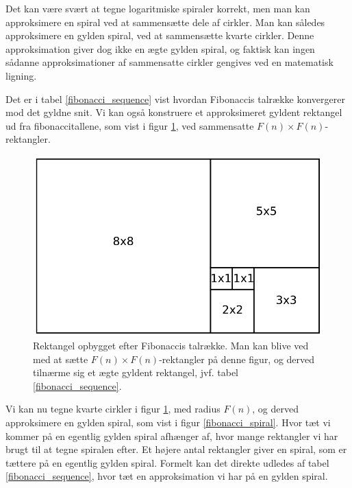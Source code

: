 {Det kan være svært at tegne logaritmiske spiraler korrekt, men man kan
approksimere en spiral ved at sammensætte dele af cirkler. Man kan
således approksimere en gylden spiral, ved at sammensætte kvarte
cirkler.  Denne approksimation giver dog ikke en ægte gylden spiral, og
faktisk kan ingen sådanne approksimationer af sammensatte cirkler
gengives ved en matematisk ligning\cite{Sharp2002}. 

Det er i tabel \ref{fibonacci_sequence} vist hvordan Fibonaccis talrække
konvergerer mod det gyldne snit. Vi kan også konstruere et approksimeret
gyldent rektangel ud fra fibonaccitallene, som vist i figur
\ref{fibonacci_rektangel}, ved sammensatte $F(n)\times F(n)$-rektangler.

\begin{figure}[t]
    \centering
	\includegraphics[scale=0.35,angle=0]{afsnit/baggrund/billeder/fib_rect}
    \caption[Rektangel opbygget efter Fibonaccis talrække]{Rektangel
    opbygget efter Fibonaccis talrække. Man kan blive ved med at sætte
    $F(n)\times F(n)$-rektangler på denne figur, og derved tilnærme sig et
    ægte gyldent rektangel, jvf. tabel \ref{fibonacci_sequence}.}
	\label{fibonacci_rektangel}
\end{figure}

Vi kan nu tegne kvarte cirkler i figur \ref{fibonacci_rektangel}, med
radius $F(n)$, og derved approksimere en gylden spiral, som vist i figur
\ref{fibonacci_spiral}. Hvor tæt vi kommer på en egentlig gylden spiral
afhænger af, hvor mange rektangler vi har brugt til at tegne spiralen
efter. Et højere antal rektangler giver en spiral, som er tættere på en
egentlig gylden spiral. Formelt kan det direkte udledes af tabel
\ref{fibonacci_sequence}, hvor tæt en approksimation vi har på en gylden
spiral.

}
